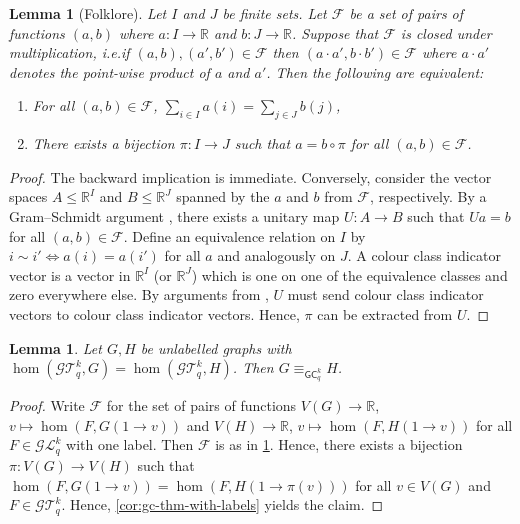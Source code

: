 \documentclass[10pt,a4paper]{article}
\newtheorem{lemma}[theorem]{Lemma}
\newcommand{\Ekq}{\ensuremath{\mathcal{T}_{q}^{k}}}
\newcommand{\Lkq}{\ensuremath{\mathcal{L}_{q}^{k}}}
\newcommand{\GEkq}{\ensuremath{\mathcal{G}\Lkq}}
\newcommand{\GEkqLL}{\ensuremath{\mathcal{G}\Ekq}}
\newcommand{\lGC}{\ensuremath{\mathsf{GC}}}
\begin{document}
\begin{lemma}[Folklore] \label{lem:interpolation}
	Let $I$ and $J$ be finite sets.
	Let $\mathcal{F}$ be a set of pairs of functions $(a, b)$ where $a \colon I \to \mathbb{R}$ and $b \colon J \to \mathbb{R}$.
	Suppose that $\mathcal{F}$ is closed under multiplication, i.e.\@ if $(a, b), (a', b') \in \mathcal{F}$ then $(a \cdot a', b \cdot b') \in \mathcal{F}$ where $a \cdot a'$ denotes the point-wise product of $a$ and $a'$.
	Then the following are equivalent:
	\begin{enumerate}
		\item For all $(a, b) \in \mathcal{F}$, $\sum_{i \in I} a(i) = \sum_{j \in J} b(j)$,
		\item There exists a bijection $\pi \colon I \to J$ such that $a = b \circ \pi$ for all $(a,b) \in \mathcal{F}$.
	\end{enumerate}
\end{lemma}
\begin{proof}
	The backward implication is immediate.
	Conversely, consider the vector spaces $A \leq \mathbb{R}^I$ and $B \leq \mathbb{R}^J$ spanned by the $a$ and $b$ from $\mathcal{F}$, respectively. By a Gram--Schmidt argument \cite[Lemma~29]{grohe_homomorphism_2021_arxiv}, there exists a unitary map $U \colon A \to B$ such that $Ua = b$ for all $(a,b) \in \mathcal{F}$.
	Define an equivalence relation on $I$ by $i  \sim i' \iff a(i) = a(i')$ for all $a$ and analogously on $J$. A colour class indicator vector is a vector in $\mathbb{R}^I$ (or $\mathbb{R}^J$) which is one on one of the equivalence classes and zero everywhere else.
	By arguments from \cite[Lemma~35]{grohe_homomorphism_2021_arxiv}, $U$ must send colour class indicator vectors to colour class indicator vectors. Hence, $\pi$ can be extracted from $U$.
\end{proof}

\begin{lemma}\label{lem:labelsBw}
  Let $G, H$ be unlabelled graphs with $\hom(\GEkqLL, G) = \hom(\GEkqLL, H)$. Then $G \equiv_{\lGC^k_q} H$.
\end{lemma}
\begin{proof}
	Write $\mathcal{F} $ for the set of pairs of functions $V(G) \to \mathbb{R}$, $v \mapsto \hom(F, G(1 \to v))$ and $V(H) \to \mathbb{R}$, $v \mapsto \hom(F, H(1 \to v))$ for all $F \in \GEkq$ with one label. Then $\mathcal{F}$ is as in \cref{lem:interpolation}. Hence, there exists a bijection $\pi \colon V(G) \to V(H)$ such that $\hom(F, G(1 \to v)) = \hom(F, H(1 \to \pi(v)))$ for all $v \in V(G)$ and $F \in \GEkqLL$. Hence, \cref{cor:gc-thm-with-labels} yields the claim.
\end{proof}
\end{document}
